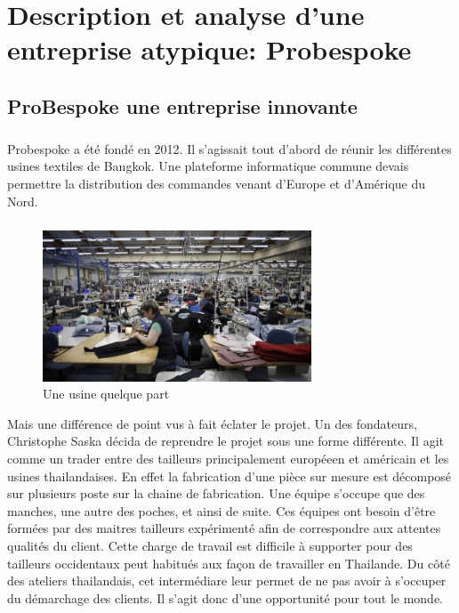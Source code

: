 \chapter{Description et analyse d'une entreprise atypique: Probespoke}
\section{ProBespoke une entreprise innovante}

\paragraph{}
Probespoke a été fondé en 2012. Il s'agissait tout d'abord de réunir les différentes usines textiles de Bangkok.
Une plateforme informatique commune devais permettre la distribution des commandes venant d'Europe et d'Amérique du Nord.
\paragraph{}
\begin{figure}
\includegraphics[width=8cm]{image/textile.jpg}
\caption{Une usine quelque part}
\end{figure}
Mais une différence de point vus à fait éclater le projet. Un des fondateurs, Christophe Saska décida de reprendre le projet sous une forme différente. Il agit comme un trader entre des tailleurs principalement européeen et américain et les usines thailandaises. En effet la fabrication d'une pièce sur mesure est décomposé sur plusieurs poste sur la chaine de fabrication. Une équipe s'occupe que des manches, une autre des poches, et ainsi de suite. Ces équipes ont besoin d'être formées par des maitres tailleurs expérimenté afin de correspondre aux attentes qualités du client. Cette charge de travail est difficile à supporter pour des tailleurs occidentaux peut habitués aux façon de travailler en Thailande. Du côté des ateliers thailandais, cet intermédiare leur permet de ne pas avoir à s'occuper du démarchage des clients. Il s'agit donc d'une opportunité pour tout le monde.
